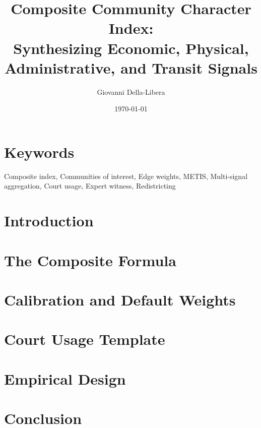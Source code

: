 \documentclass[12pt]{article}
\title{\textbf{Composite Community Character Index:\\
Synthesizing Economic, Physical, Administrative, and Transit Signals}}
\author{Giovanni Della-Libera}
\date{\today}
\begin{document}
\maketitle

\begin{abstract}

\end{abstract}

\section*{Keywords}
Composite index, Communities of interest, Edge weights, METIS,
Multi-signal aggregation, Court usage, Expert witness, Redistricting

\section{Introduction}


\section{The Composite Formula}


\section{Calibration and Default Weights}


\section{Court Usage Template}


\section{Empirical Design}


\section{Conclusion}




\end{document}
